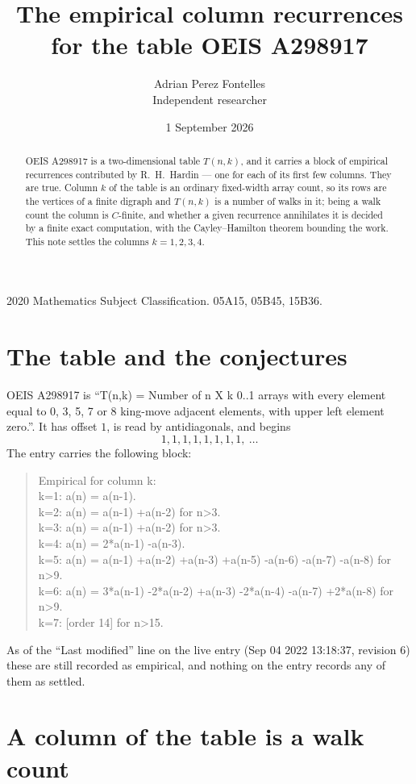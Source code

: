 \documentclass[11pt,a4paper]{article}
\title{The empirical column recurrences for the table OEIS A298917}
\author{Adrian Perez Fontelles\\ \small Independent researcher}
\date{1 September 2026}
\theoremstyle{plain}
\theoremstyle{definition}
\begin{document}
\maketitle

\begin{abstract}
OEIS A298917 is a two-dimensional table $T(n,k)$, and it carries a block of empirical
recurrences contributed by R.~H.~Hardin --- one for each of its first few columns. They are
true. Column $k$ of the table is an ordinary fixed-width array count, so its rows are the
vertices of a finite digraph and $T(n,k)$ is a number of walks in it; being a walk count the
column is $C$-finite, and whether a given recurrence annihilates it is decided by a finite
exact computation, with the Cayley--Hamilton theorem bounding the work. This note settles the columns $k=1, 2, 3, 4$.
\end{abstract}

\noindent\small 2020 Mathematics Subject Classification. 05A15, 05B45, 15B36.\normalsize

\section{The table and the conjectures}

OEIS A298917 is ``T(n,k) = Number of n X k 0..1 arrays with every element equal to 0, 3, 5, 7 or 8 king-move adjacent elements, with upper left element zero.''. It has offset $1$, is
read by antidiagonals, and begins
\[
1, 1, 1, 1, 1, 1, 1, 1,\ \dots
\]
The entry carries the following block:
\begin{quote}\small
Empirical for column k:\\
k=1: a(n) = a(n-1).\\
k=2: a(n) = a(n-1) +a(n-2) for n>3.\\
k=3: a(n) = a(n-1) +a(n-2) for n>3.\\
k=4: a(n) = 2*a(n-1) -a(n-3).\\
k=5: a(n) = a(n-1) +a(n-2) +a(n-3) +a(n-5) -a(n-6) -a(n-7) -a(n-8) for n>9.\\
k=6: a(n) = 3*a(n-1) -2*a(n-2) +a(n-3) -2*a(n-4) -a(n-7) +2*a(n-8) for n>9.\\
k=7: [order 14] for n>15.\\
\end{quote}
As of the ``Last modified'' line on the live entry (Sep 04 2022 13:18:37, revision 6) these are still
recorded as empirical, and nothing on the entry records any of them as settled.

\section{A column of the table is a walk count}
\end{document}
